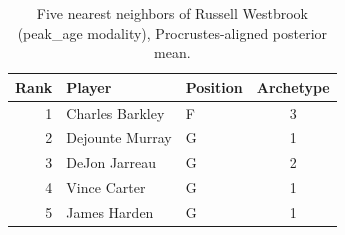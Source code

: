 \begin{table}[htbp]
  \centering\small
  \begin{tabular}{rllc}
    \toprule
    Rank & Player & Position & Archetype \\
    \midrule
    1 & Charles Barkley & F & 3 \\
    2 & Dejounte Murray & G & 1 \\
    3 & DeJon Jarreau & G & 2 \\
    4 & Vince Carter & G & 1 \\
    5 & James Harden & G & 1 \\
    \bottomrule
  \end{tabular}
  \caption{Five nearest neighbors of Russell Westbrook (peak_age modality), Procrustes-aligned posterior mean.}
  \label{tab:Russell_Westbrook_neighbors_peak_age}
\end{table}

